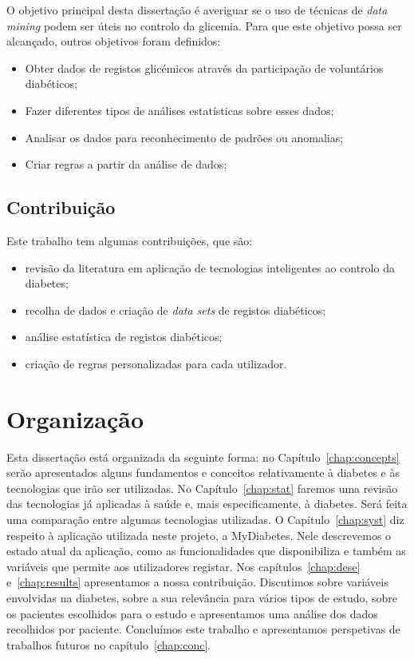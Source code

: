 O objetivo principal desta dissertação é averiguar se o uso de técnicas de \textit{data mining} podem ser úteis no controlo da glicemia. Para que este objetivo possa ser alcançado, outros objetivos foram definidos:

\begin{itemize}
	\item Obter dados de registos glicémicos através da participação de voluntários diabéticos;
	\item Fazer diferentes tipos de análises estatísticas sobre esses dados;
	\item Analisar os dados para reconhecimento de padrões ou anomalias;
	\item Criar regras a partir da análise de dados;

\end{itemize}


\subsection{Contribuição}

Este trabalho tem algumas contribuições, que são:

\begin{itemize}
	\item revisão da literatura em aplicação de tecnologias inteligentes ao controlo da diabetes;
	\item recolha de dados e criação de \textit{data sets} de registos diabéticos;
	\item análise estatística de registos diabéticos;
	\item criação de regras personalizadas para cada utilizador.
	
\end{itemize}


\section{Organização}

Esta dissertação está organizada da seguinte forma: no Capítulo~\ref{chap:concepts} serão apresentados alguns fundamentos e conceitos relativamente à diabetes e às tecnologias que irão ser utilizadas.
No Capítulo~\ref{chap:stat} faremos uma revisão das tecnologias já aplicadas à saúde e, mais especificamente, à diabetes. Será feita uma comparação entre algumas tecnologias utilizadas.
O Capítulo~\ref{chap:syst} diz respeito à aplicação utilizada neste projeto, a MyDiabetes. Nele descrevemos o estado atual da aplicação, como as funcionalidades que disponibiliza e também as variáveis que permite aos utilizadores registar.
Nos capítulos~\ref{chap:dese} e~\ref{chap:results} apresentamos a nossa contribuição. Discutimos sobre variáveis envolvidas na diabetes, sobre a sua relevância para vários tipos de estudo, sobre os pacientes escolhidos para o estudo e apresentamos uma análise dos dados recolhidos por paciente. Concluímos este trabalho e apresentamos perspetivas de trabalhos futuros no capítulo~\ref{chap:conc}.





